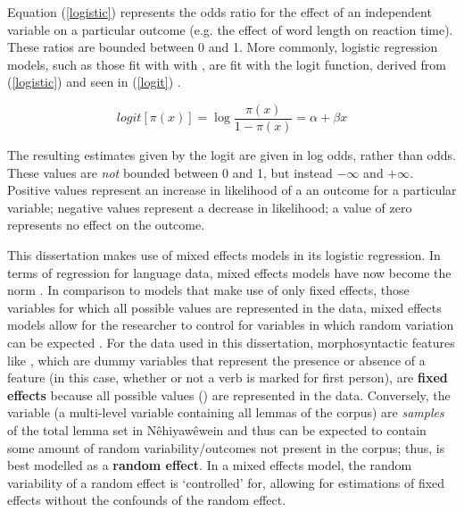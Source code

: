 Equation (\ref{logistic}) represents the odds ratio for the effect of an independent variable on a particular outcome (e.g. the effect of word length on reaction time). These ratios are bounded between 0 and 1. More commonly, logistic regression models, such as those fit with with , are fit with the logit function, derived from (\ref{logistic}) and seen in (\ref{logit}) \citep[163]{agresti2013categorical}. 

\begin{equation}
logit[\pi(x)] = \log \frac{\pi(x)}{1-\pi(x)} = \alpha + \beta x
\label{logit}
\end{equation}

The resulting estimates given by the logit are given in log odds, rather than odds. These values are \textit{not} bounded between 0 and 1, but instead $-\infty$ and $+\infty$. Positive values represent an increase in likelihood of a an outcome for a particular variable; negative values represent a decrease in likelihood; a value of zero represents no effect on the outcome. 


This dissertation makes use of mixed effects models in its logistic regression. In terms of regression for language data, mixed effects models have now become the norm \citep[100]{barth2018evaluating}. In comparison to models that make use of only fixed effects, those variables for which all possible values are represented in the data, mixed effects models allow for the researcher to control for variables in which random variation can be expected \citep{baayen2012mixed}. For the data used in this dissertation, morphosyntactic features like , which are dummy variables that represent the presence or absence of a feature (in this case, whether or not a verb is marked for first person), are \textbf{fixed effects} because all possible values () are represented in the data. Conversely, the  variable (a multi-level variable containing all lemmas of the corpus) are \textit{samples} of the total lemma set in Nêhiyawêwein and thus can be expected to contain some amount of random variability/outcomes not present in the corpus; thus,  is best modelled as a \textbf{random effect}. In a mixed effects model, the random variability of a random effect is `controlled' for, allowing for estimations of fixed effects without the confounds of the random effect. 


